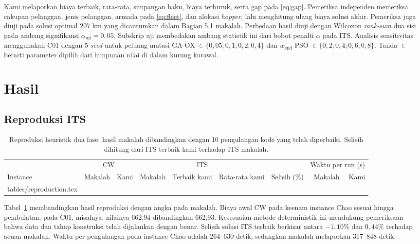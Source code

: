 \documentclass[conference]{IEEEtran}
\makeatletter
\let\tableinput\@@input
\makeatother
\begin{document}
Kami melaporkan biaya terbaik, rata-rata, simpangan baku, biaya terburuk, serta gap pada \eqref{eq:gap}. Pemeriksa independen memeriksa cakupan pelanggan, jenis pelanggan, armada pada \eqref{eq:fleet}, dan alokasi \textit{hopper}, lalu menghitung ulang biaya solusi akhir. Pemeriksa juga diuji pada solusi optimal 207 km yang dicantumkan dalam Bagian 5.1 makalah. Perbedaan hasil diuji dengan Wilcoxon \textit{rank-sum} dua sisi \cite{wilcoxon1945} pada ambang signifikansi $\alpha_{\mathrm{uji}}=0{,}05$. Subskrip $\mathrm{uji}$ membedakan ambang statistik ini dari bobot penalti $\alpha$ pada ITS. Analisis sensitivitas menggunakan C01 dengan 5 \textit{seed} untuk peluang mutasi GA-OX $\in\{0{,}05;0{,}1;0{,}2;0{,}4\}$ dan $w_{\text{end}}$ PSO $\in\{0{,}2;0{,}4;0{,}6;0{,}8\}$. Tanda $\in$ berarti parameter dipilih dari himpunan nilai di dalam kurung kurawal.

\section{Hasil}\label{sec:hasil}

\subsection{Reproduksi ITS}

\begin{table}[t]
\caption{Reproduksi heuristik dua fase: hasil makalah \cite{davila2023} dibandingkan dengan 10 pengulangan kode yang telah diperbaiki. Selisih dihitung dari ITS terbaik kami terhadap ITS makalah.}
\label{tab:repro}
\centering\footnotesize
\begin{tabular}{lrrrrrrrr}
\toprule
& \multicolumn{2}{c}{CW} & \multicolumn{3}{c}{ITS} & & \multicolumn{2}{c}{Waktu per run (s)}\\
\cmidrule(lr){2-3}\cmidrule(lr){4-6}\cmidrule(lr){8-9}
Instance & Makalah & Kami & Makalah & Terbaik kami & Rata-rata kami & Selisih (\%) & Makalah & Kami\\
\midrule
\tableinput tables/reproduction.tex 
\bottomrule
\end{tabular}
\end{table}

Tabel~\ref{tab:repro} membandingkan hasil reproduksi dengan angka pada makalah. Biaya awal CW pada keenam instance Chao sesuai hingga pembulatan; pada C01, misalnya, nilainya 662,94 dibandingkan 662,93. Kesesuaian metode deterministik ini mendukung pemeriksaan bahwa data dan tahap konstruksi telah dijalankan dengan benar. Selisih solusi ITS terbaik berkisar antara $-1{,}10\%$ dan $0{,}44\%$ terhadap acuan makalah. Waktu per pengulangan pada instance Chao adalah 264--630 detik, sedangkan makalah melaporkan 317--848 detik.
\end{document}
